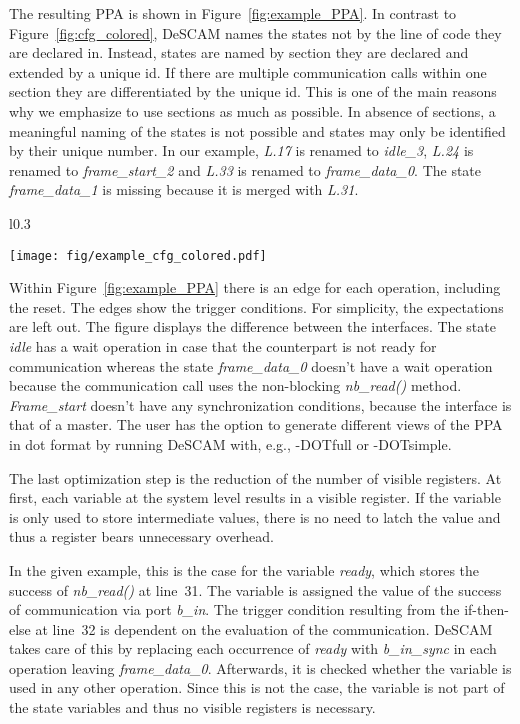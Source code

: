 The resulting PPA is shown in Figure~\ref{fig:example_PPA}. 
In contrast to Figure~\ref{fig:cfg_colored}, DeSCAM names the states not by the line of code they are declared in. 
Instead, states are named by section they are declared and extended by a unique id. 
If there are multiple communication calls within one section they are differentiated by the unique id. 
This is one of the main reasons why we emphasize to use sections as much as possible. 
In absence of sections, a meaningful naming of the states is not possible and states may only be identified by their unique number. 
In our example, \textit{L.17} is renamed to \textit{idle\_3}, \textit{L.24} is renamed to \textit{frame\_start\_2} and \textit{L.33} is renamed to \textit{frame\_data\_0}. The state \textit{frame\_data\_1} is missing because it is merged with \textit{L.31}.

\begin{wrapfigure}{l}{0.3\textwidth}
	\vspace{-20pt}
    \caption{Example blockCFG}
    \label{fig:cfg_colored}
    \texttt{[image: fig/example\_cfg\_colored.pdf]}
    \vspace{-20pt}
\end{wrapfigure}

Within Figure~\ref{fig:example_PPA} there is an edge for each operation, including the reset. 
The edges show the trigger conditions. For simplicity, the expectations are left out. 
The figure displays the difference between the interfaces. 
The state \textit{idle} has a wait operation in case that the counterpart is not ready for communication whereas the state \textit{frame\_data\_0} doesn't have a wait operation because the communication call uses the non-blocking \textit{nb\_read()} method. 
\textit{Frame\_start} doesn't have any synchronization conditions, because the interface is that of a master.  
The user has the option to generate different views of the PPA in dot format by running DeSCAM with, e.g., -DOTfull or -DOTsimple.  

The last optimization step is the reduction of the number of visible registers. 
At first, each variable at the system level results in a visible register. 
If the variable is only used to store intermediate values, there is no need to latch the value and thus a register bears unnecessary overhead. 

In the given example, this is the case for the variable \textit{ready}, which stores the success of \textit{nb\_read()} at line~31. 
The variable is assigned the value of the success of communication via port \textit{b\_in}. 
The trigger condition resulting from the if-then-else at line~32 is dependent on the evaluation of the communication. 
DeSCAM takes care of this by replacing each occurrence of \textit{ready} with \textit{b\_in\_sync} in each operation leaving \textit{frame\_data\_0}.
Afterwards, it is checked whether the variable is used in any other operation.
Since this is not the case, the variable is not part of the state variables and thus no visible registers is necessary. 
 
